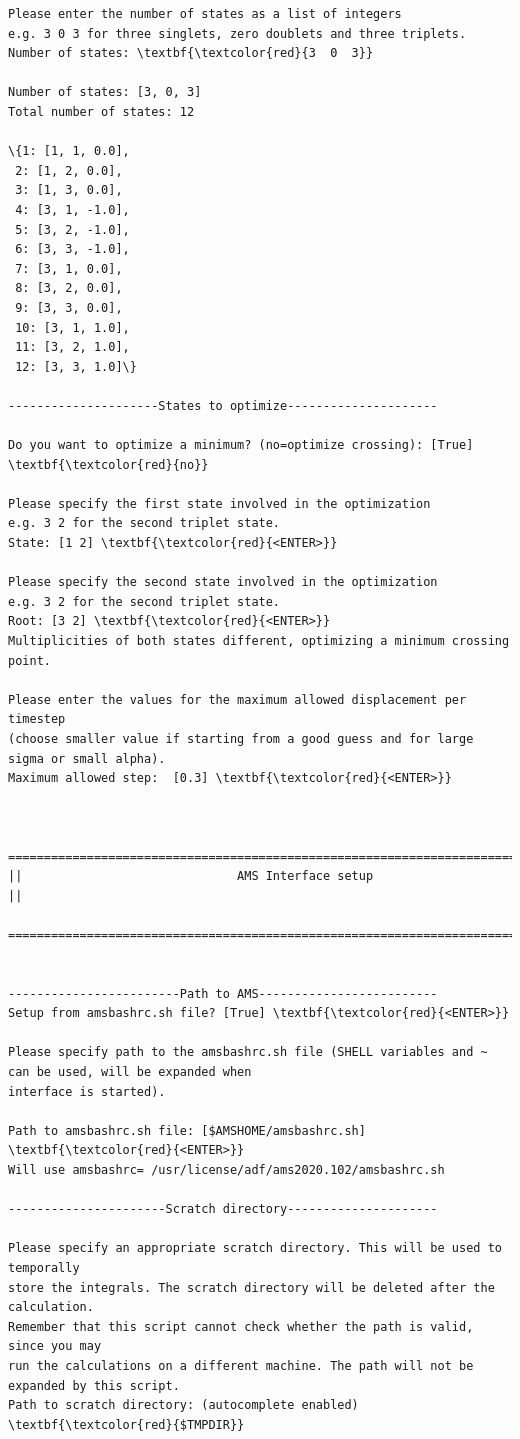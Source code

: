 \documentclass[a4paper,11pt,DIV=15,openany]{scrbook}
\begin{document}
\begin{oframed}
\begin{Verbatim}[commandchars=\\\{\}]
Please enter the number of states as a list of integers
e.g. 3 0 3 for three singlets, zero doublets and three triplets.
Number of states: \textbf{\textcolor{red}{3  0  3}}

Number of states: [3, 0, 3]
Total number of states: 12

\{1: [1, 1, 0.0],
 2: [1, 2, 0.0],
 3: [1, 3, 0.0],
 4: [3, 1, -1.0],
 5: [3, 2, -1.0],
 6: [3, 3, -1.0],
 7: [3, 1, 0.0],
 8: [3, 2, 0.0],
 9: [3, 3, 0.0],
 10: [3, 1, 1.0],
 11: [3, 2, 1.0],
 12: [3, 3, 1.0]\}

---------------------States to optimize---------------------

Do you want to optimize a minimum? (no=optimize crossing): [True] \textbf{\textcolor{red}{no}}

Please specify the first state involved in the optimization
e.g. 3 2 for the second triplet state.
State: [1 2] \textbf{\textcolor{red}{<ENTER>}}

Please specify the second state involved in the optimization
e.g. 3 2 for the second triplet state.
Root: [3 2] \textbf{\textcolor{red}{<ENTER>}}
Multiplicities of both states different, optimizing a minimum crossing point.

Please enter the values for the maximum allowed displacement per timestep 
(choose smaller value if starting from a good guess and for large sigma or small alpha).
Maximum allowed step:  [0.3] \textbf{\textcolor{red}{<ENTER>}} 


  ================================================================================
||                              AMS Interface setup                               ||
  ================================================================================


------------------------Path to AMS-------------------------
Setup from amsbashrc.sh file? [True] \textbf{\textcolor{red}{<ENTER>}}

Please specify path to the amsbashrc.sh file (SHELL variables and ~ can be used, will be expanded when 
interface is started).

Path to amsbashrc.sh file: [$AMSHOME/amsbashrc.sh] \textbf{\textcolor{red}{<ENTER>}}
Will use amsbashrc= /usr/license/adf/ams2020.102/amsbashrc.sh

----------------------Scratch directory---------------------

Please specify an appropriate scratch directory. This will be used to temporally 
store the integrals. The scratch directory will be deleted after the calculation. 
Remember that this script cannot check whether the path is valid, since you may 
run the calculations on a different machine. The path will not be expanded by this script.
Path to scratch directory: (autocomplete enabled) \textbf{\textcolor{red}{$TMPDIR}}


\end{Verbatim}
\end{oframed}
\end{document}
